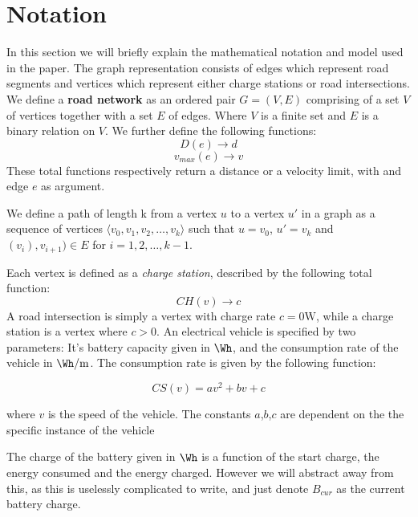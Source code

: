 \section{Notation}
In this section we will briefly explain the mathematical notation and model used in the paper. The graph representation consists of edges which represent road segments and vertices which represent either charge stations or road intersections. We define a \textbf{road network} as an ordered pair \(G=(V,E)\) comprising of a set $V$ of vertices together with a set $E$ of edges. Where $V$ is a finite set and $E$ is a binary relation on $V$. We further define the following functions:
\[ D(e)\rightarrow d \] 
\[ v_{max}(e)\rightarrow v \] 
These total functions respectively return a distance or a velocity limit, with and edge $e$ as argument.

We define a path of length k from a vertex $u$ to a vertex $u'$ in a graph as a sequence of vertices $\langle v_0,v_1,v_2,\dots,v_k \rangle$ such that $u=v_0$, $u'=v_k$ and $(v_{i}),v_{i+1})\in E$ for $i=1,2,\dots ,k-1$.

Each vertex is defined as a \textit{charge station}, described by the following total function:
\[CH(v)\rightarrow c\]
A road intersection is simply a vertex with charge rate $c = 0\si{\W}$, while a charge station is a vertex where $c > 0$. An electrical vehicle is specified by two parameters: It's battery capacity given in $\si{\Wh}$, and the consumption rate of the vehicle in $\si{\Wh\per\metre}$. The consumption rate is given by the following function:

\[CS(v)=av^2+bv+c\]

where $v$ is the speed of the vehicle. The constants $a$,$b$,$c$ are dependent on the the specific instance of the vehicle  

The charge of the battery given in $\si{\Wh}$ is a function of the start charge, the energy consumed and the energy charged. However we will abstract away from this, as this is uselessly complicated to write, and just denote $B_{cur}$ as the current battery charge.

